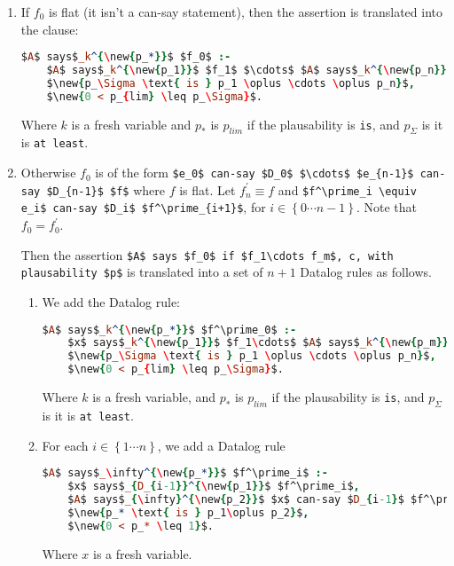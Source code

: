 \documentclass[a4paper]{article}
\newcommand{\new}[1]{{\color{BrickRed} #1}}
\begin{document}
\begin{enumerate}
\item 
  If $f_0$ is flat (it isn't a can-say statement), then the assertion is translated into the clause:
  \begin{lstlisting}[language=Prolog]
$A$ says$_k^{\new{p_*}}$ $f_0$ :- 
    $A$ says$_k^{\new{p_1}}$ $f_1$ $\cdots$ $A$ says$_k^{\new{p_n}}$ $f_n$, c, 
    $\new{p_\Sigma \text{ is } p_1 \oplus \cdots \oplus p_n}$, 
    $\new{0 < p_{lim} \leq p_\Sigma}$.
  \end{lstlisting}
  Where $k$ is a fresh variable \new{and $p_*$ is $p_{lim}$ if the plausability is \texttt{is}, and $p_\Sigma$ is it is \texttt{at least}}.
  
\item 
  Otherwise $f_0$ is of the form \lstinline!$e_0$ can-say $D_0$ $\cdots$ $e_{n-1}$ can-say $D_{n-1}$ $f$! where $f$ is flat.
  Let $f^\prime_n \equiv f$ and \lstinline!$f^\prime_i \equiv e_i$ can-say $D_i$ $f^\prime_{i+1}$!, for $i\in\left\{0\cdots n-1\right\}$.
  Note that $f_0 = f^\prime_0$.  

  Then the assertion \lstinline!$A$ says $f_0$ if $f_1\cdots f_m$, c, with plausability $p$! is translated into a set of $n+1$ Datalog rules as follows.
  
  \begin{enumerate}
  \item 
    We add the Datalog rule:
    \begin{lstlisting}[language=Prolog]
$A$ says$_k^{\new{p_*}}$ $f^\prime_0$ :-
    $x$ says$_k^{\new{p_1}}$ $f_1\cdots$ $A$ says$_k^{\new{p_m}}$ $f_m$, c,
    $\new{p_\Sigma \text{ is } p_1 \oplus \cdots \oplus p_n}$, 
    $\new{0 < p_{lim} \leq p_\Sigma}$.
    \end{lstlisting}
    Where $k$ is a fresh variable, \new{and $p_*$ is $p_{lim}$ if the plausability is \texttt{is}, and $p_\Sigma$ is it is \texttt{at least}}.

  \item
    For each $i\in\left\{1\cdots n\right\}$, we add a Datalog rule
    \begin{lstlisting}[language=Prolog]
$A$ says$_\infty^{\new{p_*}}$ $f^\prime_i$ :-
    $x$ says$_{D_{i-1}}^{\new{p_1}}$ $f^\prime_i$,
    $A$ says$_{\infty}^{\new{p_2}}$ $x$ can-say $D_{i-1}$ $f^\prime_i$,
    $\new{p_* \text{ is } p_1\oplus p_2}$, 
    $\new{0 < p_* \leq 1}$.
    \end{lstlisting}
    Where $x$ is a fresh variable.
  \end{enumerate}
  

\end{enumerate}
\end{document}
